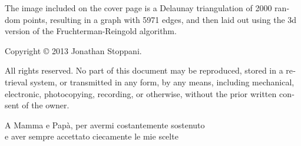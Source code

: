 \begin{otherlanguage}{english}
%

\vfill

The image included on the cover page is a Delaunay triangulation of 2000 random points, resulting in a graph with 5971 edges, and then laid out using the \gls{3d} version of the Fruchterman-Reingold algorithm.

\vfill

Copyright © 2013 Jonathan Stoppani.

All rights reserved. No part of this document may be reproduced, stored in a retrieval system, or transmitted in any form, by any means, including mechanical, electronic, photocopying, recording, or otherwise, without the prior written consent of the owner.

\restoregeometry
\end{otherlanguage} 

\cleartoodd
\thispagestyle{empty}


\vspace*{7cm}

\hspace*{2.5cm}A Mamma e Papà, per avermi costantemente sostenuto \\
\hspace*{5cm}e aver sempre accettato ciecamente le mie scelte

\restoregeometry

